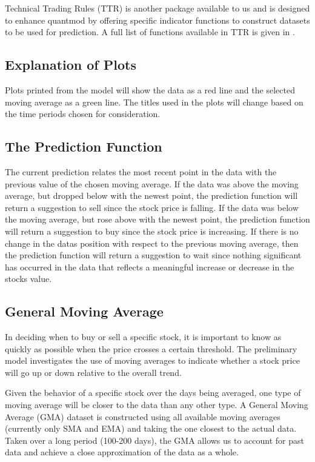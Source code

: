 \documentclass[11pt]{article}
\newcommand*\apos{\textsc{\char13}}
\begin{document}
Technical Trading Rules (TTR) is another package available to us and is designed to enhance quantmod by offering specific indicator functions to construct datasets to be used for prediction. A full list of functions available in TTR is given in \cite{TTR}. 

\subsection*{Explanation of Plots}\label{plots}
Plots printed from the model will show the data as a red line and the selected moving average as a green line. The titles used in the plots will change based on the time periods chosen for consideration.

\subsection*{The Prediction Function}\label{quant}
The current prediction relates the most recent point in the data with the previous value of the chosen moving average. If the data was above the moving average, but dropped below with the newest point, the prediction function will return a suggestion to sell since the stock price is falling. If the data was below the moving average, but rose above with the newest point, the prediction function will return a suggestion to buy since the stock price is increasing. If there is no change in the data\apos s position with respect to the previous moving average, then the prediction function will return a suggestion to wait since nothing significant has occurred in the data that reflects a meaningful increase or decrease in the stock\apos s value.

\subsection*{General Moving Average}\label{GMA}
In deciding when to buy or sell a specific stock, it is important to know as quickly as possible when the price crosses a certain threshold. The preliminary model investigates the use of moving averages to indicate whether a stock price will go up or down relative to the overall trend.

Given the behavior of a specific stock over the days being averaged, one type of moving average will be closer to the data than any other type. A General Moving Average (GMA) dataset is constructed using all available moving averages (currently only SMA and EMA) and taking the one closest to the actual data. Taken over a long period (100-200 days), the GMA allows us to account for past data and achieve a close approximation of the data as a whole. 
\end{document}
